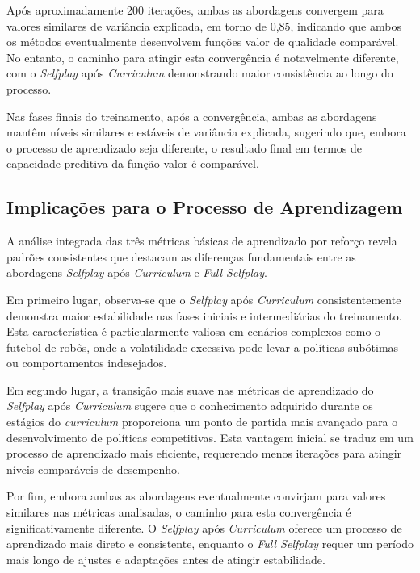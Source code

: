 Após aproximadamente 200 iterações, ambas as abordagens convergem para valores similares de variância explicada, em torno de 0,85, indicando que ambos os métodos eventualmente desenvolvem funções valor de qualidade comparável. No entanto, o caminho para atingir esta convergência é notavelmente diferente, com o \textit{Selfplay} após \textit{Curriculum} demonstrando maior consistência ao longo do processo.

Nas fases finais do treinamento, após a convergência, ambas as abordagens mantêm níveis similares e estáveis de variância explicada, sugerindo que, embora o processo de aprendizado seja diferente, o resultado final em termos de capacidade preditiva da função valor é comparável.

\subsection{Implicações para o Processo de Aprendizagem}

A análise integrada das três métricas básicas de aprendizado por reforço revela padrões consistentes que destacam as diferenças fundamentais entre as abordagens \textit{Selfplay} após \textit{Curriculum} e \textit{Full Selfplay}.

Em primeiro lugar, observa-se que o \textit{Selfplay} após \textit{Curriculum} consistentemente demonstra maior estabilidade nas fases iniciais e intermediárias do treinamento. Esta característica é particularmente valiosa em cenários complexos como o futebol de robôs, onde a volatilidade excessiva pode levar a políticas subótimas ou comportamentos indesejados.

Em segundo lugar, a transição mais suave nas métricas de aprendizado do \textit{Selfplay} após \textit{Curriculum} sugere que o conhecimento adquirido durante os estágios do \textit{curriculum} proporciona um ponto de partida mais avançado para o desenvolvimento de políticas competitivas. Esta vantagem inicial se traduz em um processo de aprendizado mais eficiente, requerendo menos iterações para atingir níveis comparáveis de desempenho.

Por fim, embora ambas as abordagens eventualmente convirjam para valores similares nas métricas analisadas, o caminho para esta convergência é significativamente diferente. O \textit{Selfplay} após \textit{Curriculum} oferece um processo de aprendizado mais direto e consistente, enquanto o \textit{Full Selfplay} requer um período mais longo de ajustes e adaptações antes de atingir estabilidade.

